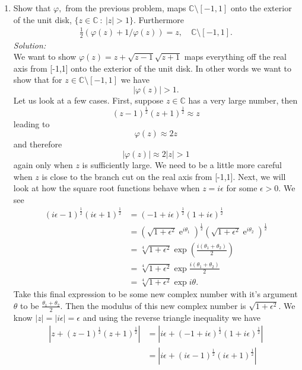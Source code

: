 \documentclass[10pt]{amsart}
\DeclareMathOperator{\E}{e}
\theoremstyle{nonumberplain}
\begin{document}
\begin{enumerate}[label={\bf {\arabic*}:}]
 \item Show that $\varphi,$ from the previous problem, maps $\mathbb C \setminus [-1,1]$ onto the
   exterior of the unit disk, $\{ z \in \mathbb C ~:~ |z| > 1\}$.
   Furthermore
   \begin{align*}
     \frac 1 2 \left( \varphi(z) + 1/\varphi(z) \right) = z, \quad \mathbb C \setminus [-1,1].
   \end{align*}
\textit{Solution:} \\
We want to show $\varphi(z) = z + \sqrt{z - 1}\sqrt{z + 1}$ maps everything off the real axis from [-1,1] onto the exterior of the unit disk. In other words we want to show that for $z \in \mathbb C \setminus [-1,1]$ we have 
$$
\left| \varphi(z) \right| > 1.
$$
Let us look at a few cases. First, suppose $z \in \mathbb C$ has a very large number, then
$$
(z - 1)^{\frac{1}{2}}(z + 1)^{\frac{1}{2}} \approx z
$$
leading to
$$
\varphi(z) \approx 2z
$$
and therefore
$$
|\varphi(z)| \approx 2|z| > 1
$$
again only when $z$ is sufficiently large.
We need to be a little more careful when $z$ is close to the branch cut on the real axis from [-1,1].
Next, we will look at how the square root functions behave when $z = i\epsilon$ for some $\epsilon > 0$.
We see
\begin{align*}
(i\epsilon -1)^{\frac{1}{2}}(i\epsilon + 1)^{\frac{1}{2}} &= (-1 + i\epsilon)^{\frac{1}{2}}(1 + i\epsilon)^{\frac{1}{2}} \\
									      &= (\sqrt{1 + \epsilon^2}\E^{i\theta_1})^{\frac{1}{2}}(\sqrt{1 + \epsilon^2}\E^{i\theta_2})^{\frac{1}{2}} \\
									      &= \sqrt[4]{1 + \epsilon^2}\exp{\left(\frac{i(\theta_1 + \theta_2)}{2}\right)} \\
									      &= \sqrt[4]{1 + \epsilon^2}\exp{\frac{i(\theta_1 + \theta_2)}{2}} \\
									      &= \sqrt[4]{1 + \epsilon^2}\exp{i\theta}.
\end{align*}
Take this final expression to be some new complex number with it's argument $\theta$ to be $\frac{\theta_1 + \theta_2}{2}$.
Then the modulus of this new complex number is $\sqrt{1 + \epsilon^2}$.
We know $|z| = |i\epsilon| = \epsilon$ and using the reverse triangle inequality we have
\begin{align*}
\left| z + (z - 1)^{\frac{1}{2}}(z + 1)^{\frac{1}{2}}\right| &= \left| i\epsilon + (- 1 + i\epsilon)^{\frac{1}{2}}(1 + i\epsilon)^{\frac{1}{2}}\right| \\
										  &= \left| i\epsilon + (i\epsilon - 1)^{\frac{1}{2}}(i\epsilon + 1)^{\frac{1}{2}}\right| \\

\end{align*}
\end{enumerate}
\end{document}
